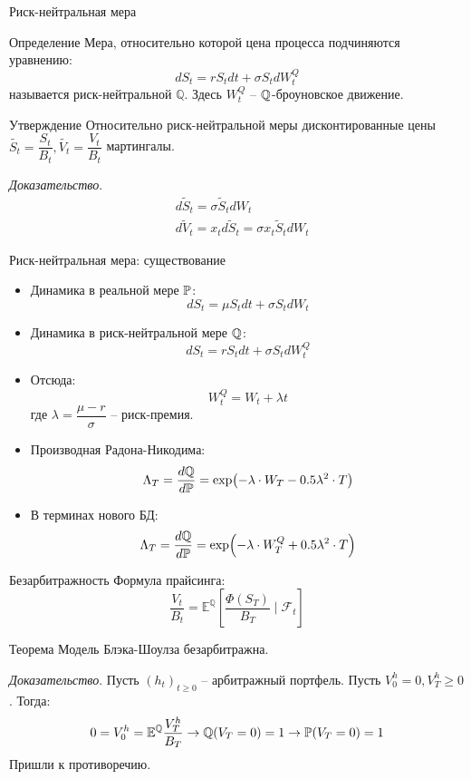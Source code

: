 \documentclass[aspectratio=169]{beamer}
\begin{document}
\begin{frame}{Риск-нейтральная мера}
    \begin{block}{Определение}
        Мера, относительно которой цена процесса подчиняются уравнению:
        $$
            dS_t = r S_t dt + \sigma S_t dW_t^Q
        $$ называется риск-нейтральной $\mathbb{Q}$. Здесь $W_t^Q$ -- $\mathbb{Q}$-броуновское движение.
    \end{block}
    \pause
    \begin{block}{Утверждение}
        Относительно риск-нейтральной меры дисконтированные цены $\widetilde{S_t} = \dfrac{S_t}{B_t}, \widetilde{V_t} = \dfrac{V_t}{B_t}$ мартингалы.
    \end{block}
    \pause
    \textit{Доказательство}. 
    \begin{align*}
        &d \widetilde S_t = \sigma \widetilde S_t dW_t \\
        &d \widetilde V_t = x_t d \widetilde S_t = \sigma x_t \widetilde S_t dW_t 
    \end{align*}
\end{frame}

\begin{frame}{Риск-нейтральная мера: существование}
    \begin{itemize}
        \item Динамика в реальной мере $\mathbb{P}$:
        $$
            dS_t = \mu S_t dt + \sigma S_t dW_t
        $$
        \item Динамика в риск-нейтральной мере $\mathbb{Q}$:
        $$
            dS_t = r S_t dt + \sigma S_t dW_t^Q
        $$ 
        \item  Отсюда:
        $$
            W_t^Q = W_t + \lambda t 
        $$ где $\lambda = \dfrac{\mu - r}{\sigma}$ -- риск-премия.
        \item Производная Радона-Никодима:
        $$
            \Lambda_T = \dfrac{d\mathbb{Q}}{d\mathbb{P}} = \exp(-\lambda \cdot W_T - 0.5 \lambda^2 \cdot T)
        $$
        \item В терминах нового БД:
        $$
            \Lambda_T = \dfrac{d\mathbb{Q}}{d\mathbb{P}} = \exp(-\lambda \cdot W_T^Q + 0.5 \lambda^2 \cdot T)
        $$
    \end{itemize}
\end{frame}


\begin{frame}{Безарбитражность}
    Формула прайсинга:
    $$
        \dfrac{V_t}{B_t} = \mathbb{E}^{\mathbb{Q}}
        \left[ \dfrac{\Phi(S_T)}{B_T} \mid \mathcal{F}_t\right]
    $$
    \begin{block}{Теорема}
        Модель Блэка-Шоулза безарбитражна. 
    \end{block}
    \textit{Доказательство}. Пусть $(h_t)_{t\geq 0}$ -- арбитражный портфель. Пусть $V_0^h = 0, V_T^h \geq 0$. Тогда:
    $$
        0 = V_0^h = \mathbb{E}^{\mathbb{Q}} \dfrac{V_T^h}{B_T} \to \mathbb{Q}(V_T = 0) = 1
        \to \mathbb{P}(V_T=0)=1
    $$Пришли к противоречию.
\end{frame}
\end{document}
